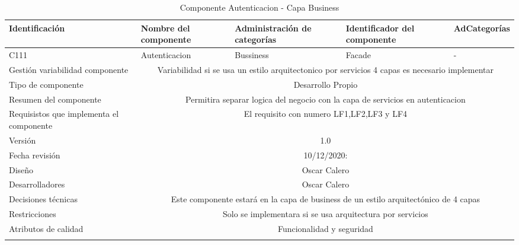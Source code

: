 \documentclass[10pt,a4paper,openany]{book}
\begin{document}
\begin{longtable}{|p{3cm}|p{3cm}|p{3cm}|p{3cm}|p{3cm}|} \hline
Identificación & Nombre del componente & Administración de categorías & Identificador del componente & AdCategorías \\[0.5ex] \hline
C111& Autenticacion& Bussiness& Facade& -\\[0.5ex] \hline
Gestión variabilidad componente & \multicolumn{4}{|c|}{Variabilidad si se usa un estilo arquitectonico por servicios 4 capas es necesario implementar} \\ \hline
Tipo de componente & \multicolumn{4}{|c|}{Desarrollo Propio} \\ \hline
Resumen del componente & \multicolumn{4}{|c|}{Permitira separar logica del negocio con la capa de servicios en autenticacion} \\ \hline
Requisistos que implementa el componente & \multicolumn{4}{|c|}{El requisito con numero LF1,LF2,LF3 y LF4 } \\ \hline
Versión & \multicolumn{4}{|c|}{1.0 } \\ \hline
Fecha revisión & \multicolumn{4}{|c|}{ 10/12/2020:} \\ \hline
Diseño & \multicolumn{4}{|c|}{Oscar Calero} \\ \hline
Desarrolladores & \multicolumn{4}{|c|}{Oscar Calero} \\ \hline
Decisiones técnicas & \multicolumn{4}{|c|}{Este componente estará en la capa de business de un estilo arquitectónico de 4 capas  } \\ \hline
Restricciones & \multicolumn{4}{|c|}{Solo se implementara si se usa arquitectura por servicios} \\ \hline
Atributos de calidad & \multicolumn{4}{|c|}{Funcionalidad y seguridad} \\ \hline
\caption{Componente Autenticacion - Capa Business}
\label{table:t6}
\end{longtable}
\end{document}
